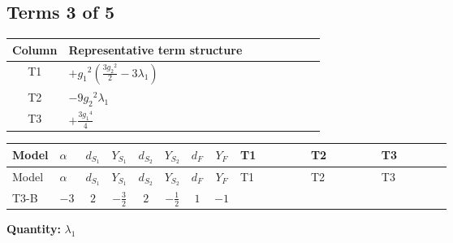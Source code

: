 \documentclass[8pt]{article}
\begin{document}
\begin{landscape}
\subsection*{Terms 3 of 5}
\begin{center}
\begin{tabular}{@{}c >{\raggedright\arraybackslash}p{0.82\linewidth}@{}}
\toprule
Column & Representative term structure \\
\midrule
T1 & \(\displaystyle +{g_1}^2 \left(\frac{3 {g_2}^2}{2}-3 {\lambda_1}\right)\) \\
\midrule
T2 & \(\displaystyle -9 {g_2}^2 {\lambda_1}\) \\
\midrule
T3 & \(\displaystyle +\frac{3 {g_1}^4}{4}\) \\
\midrule
\bottomrule
\end{tabular}
\end{center}
\smallskip
\tiny
\begin{longtable}{@{}llcccccc >{\raggedright\arraybackslash}p{0.21\linewidth} >{\raggedright\arraybackslash}p{0.21\linewidth} >{\raggedright\arraybackslash}p{0.21\linewidth}@{}}
\toprule
Model & $\alpha$ & $d_{S_1}$ & $Y_{S_1}$ & $d_{S_2}$ & $Y_{S_2}$ & $d_F$ & $Y_F$ & T1 & T2 & T3 \\
\midrule
\endfirsthead
\toprule
Model & $\alpha$ & $d_{S_1}$ & $Y_{S_1}$ & $d_{S_2}$ & $Y_{S_2}$ & $d_F$ & $Y_F$ & T1 & T2 & T3 \\
\midrule
\endhead
T3-B & $-3$ & $2$ & $-\frac{3}{2}$ & $2$ & $-\frac{1}{2}$ & $1$ & $-1$ & \scriptsize\adjustbox{max width=\linewidth}{$\begin{gathered} +{g_1}^2 \left(\frac{3 {g_2}^2}{2}-3 {\lambda_1}\right)\end{gathered}$} & \scriptsize\adjustbox{max width=\linewidth}{$\begin{gathered} -9 {g_2}^2 {\lambda_1}\end{gathered}$} & \scriptsize\adjustbox{max width=\linewidth}{$\begin{gathered} +\frac{3 {g_1}^4}{4}\end{gathered}$} \\
\midrule
\bottomrule
\end{longtable}
\clearpage
\noindent\textbf{Quantity: }$\lambda_1$\par\smallskip

\end{landscape}
\end{document}

